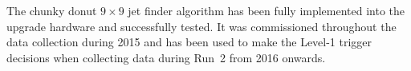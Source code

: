The chunky donut $9\times9$ \TT jet finder algorithm has been fully
implemented into the upgrade hardware and successfully tested. It was
commissioned throughout the data collection during 2015 and has been
used to make the Level-1 trigger decisions when collecting data during
Run~2 from 2016 onwards.



